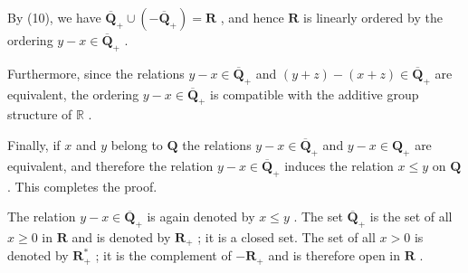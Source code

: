 By (10), we have \(\overline{\mathbf{Q}}_{+} \cup (-\overline{\mathbf{Q}}_{+}) = \mathbf{R}\) , and hence \(\mathbf{R}\) is linearly ordered by the ordering \(y - x \in \overline{\mathbf{Q}}_{+}\) .

Furthermore, since the relations \(y - x \in \overline{\mathbf{Q}}_+\) and \((y + z) - (x + z) \in \overline{\mathbf{Q}}_+\) are equivalent, the ordering \(y - x \in \overline{\mathbf{Q}}_+\) is compatible with the additive group structure of \(\mathbb{R}\) .

Finally, if \(x\) and \(y\) belong to \(\mathbf{Q}\) the relations \(y - x \in \overline{\mathbf{Q}}_+\) and \(y - x \in \mathbf{Q}_+\) are equivalent, and therefore the relation \(y - x \in \overline{\mathbf{Q}}_+\) induces the relation \(x \leqslant y\) on \(\mathbf{Q}\) . This completes the proof.

The relation \(y - x \in \overline{\mathbf{Q}}_+\) is again denoted by \(x \leqslant y\) . The set \(\overline{\mathbf{Q}}_+\) is the set of all \(x \geqslant 0\) in \(\mathbf{R}\) and is denoted by \(\mathbf{R}_+\) ; it is a closed set. The set of all \(x > 0\) is denoted by \(\mathbf{R}_+^*\) ; it is the complement of \(-\mathbf{R}_+\) and is therefore open in \(\mathbf{R}\) .

